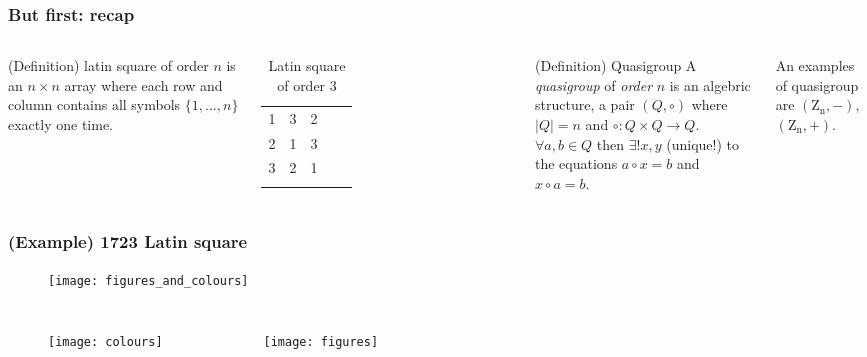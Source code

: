 \begin{frame}
	\frametitle{But first: recap}
	\begin{columns}
		\begin{block}{(Definition) latin square of order $n$}
			is an $n \times n$ array where each row and column contains all symbols $\{1,...,n\}$ exactly one time.
		\end{block}
	\begin{table}[]
		\begin{tabular}{cccll}
			\cline{1-3}
			\multicolumn{1}{|c|}{1} & \multicolumn{1}{c|}{3} & \multicolumn{1}{c|}{2} &  &  \\ \cline{1-3}
			\multicolumn{1}{|c|}{2} & \multicolumn{1}{c|}{1} & \multicolumn{1}{c|}{3} &  &  \\ \cline{1-3}
			\multicolumn{1}{|c|}{3} & \multicolumn{1}{c|}{2} & \multicolumn{1}{c|}{1} &  &  \\ \cline{1-3}
			\multicolumn{1}{l}{}    & \multicolumn{1}{l}{}   & \multicolumn{1}{l}{}   &  & 
		\end{tabular}
	\caption{Latin square of order $3$}
	\end{table}
	
		\begin{block}{(Definition) Quasigroup}
		A \textit{quasigroup} of \textit{order} $n$ is an algebric structure, a pair $(Q,\circ)$ where $|Q|=n$ and $\circ : Q \times Q \rightarrow Q$.\\ $\forall a,b \in Q$ then $\exists! x,y$ (unique!) to the equations $a \circ x = b$ and $x \circ a = b$. 
		\end{block}

		An examples of quasigroup are $(\mathrm{Z_n},-)$,$(\mathrm{Z_n},+)$.
	\end{columns}
\end{frame}

\begin{frame}
\frametitle{(Example) 1723 Latin square}
\pause[1]
\begin{figure}
	\texttt{[image: figures\_and\_colours]}
\end{figure}

\begin{columns}
	\column[]{0.5\textwidth}
	\pause[2]
	\begin{figure}
		\texttt{[image: colours]}
	\end{figure}
	\column[]{0.5\textwidth}
	\pause[3]
	\begin{figure}
		\texttt{[image: figures]}
	\end{figure}
	
\end{columns}
\end{frame}


